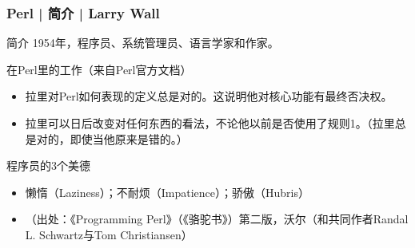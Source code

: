 \begin{frame}
  \frametitle{Perl | 简介 | Larry Wall}
  \begin{block}{简介}
    1954年，程序员、系统管理员、语言学家和作家。
  \end{block}
  \pause
  \begin{block}{在Perl里的工作（来自Perl官方文档）}
    \begin{itemize}
      \item 拉里对Perl如何表现的定义总是对的。这说明他对核心功能有最终否决权。
      \item 拉里可以日后改变对任何东西的看法，不论他以前是否使用了规则1。（拉里总是对的，即使当他原来是错的。）
    \end{itemize}
  \end{block}
  \pause
  \begin{block}{程序员的3个美德}
    \begin{itemize}
      \item 懒惰（Laziness）；不耐烦（Impatience）；骄傲（Hubris）
      \item （出处：《Programming Perl》（《骆驼书》）第二版，沃尔（和共同作者Randal L.  Schwartz与Tom Christiansen）
    \end{itemize}
  \end{block}
\end{frame}

